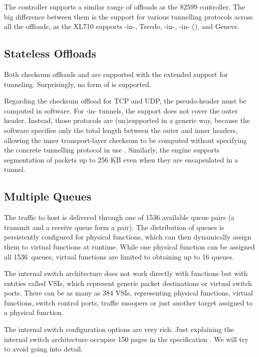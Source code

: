 The controller supports a similar range of offloads as the 82599 controller. The
big difference between them is the support for various tunnelling protocols
across all the offloads, as the XL710 supports -in-, Teredo,
-in-, -in- (),  and Geneve.

\subsection{Stateless Offloads}

Both checksum offloads and  are supported with the extended support for
tunneling. Surprisingly, no form of  is supported.

Regarding the checksum offload for TCP and UDP, the pseudo-header must be
computed in software. For -in- tunnels, the support does not
cover the outer  header. Instead, those protocols are (un)supported in
a generic way, because the software specifies only the total length between
the outer and inner  headers, allowing the inner transport-layer checksum to
be computed without specifying the concrete tunnelling protocol in use
. Similarly, the  engine
supports  segmentation of packets up to 256 KB even when they are
encapsulated in a tunnel.

\subsection{Multiple Queues}

The traffic to host is delivered through one of 1536 available queue pairs
(a transmit and a receive queue form a pair). The distribution of queues is
persistently configured for physical functions, which can then dynamically
assign them to virtual functions at runtime. While one physical function can be
assigned all 1536~queues, virtual functions are limited to obtaining up to 16 queues.

The internal switch architecture does not work directly with functions but with
entities called \glspl{VSI}, which represent generic packet destinations or
virtual switch ports. There can be as many as 384 \glspl{VSI},
representing physical functions, virtual functions, switch control ports,
traffic snoopers or just another target assigned to a physical function.

The internal switch configuration options are very rich. Just explaining the
internal switch architecture occupies 150 pages in the specification
. We will try to avoid going into detail.

